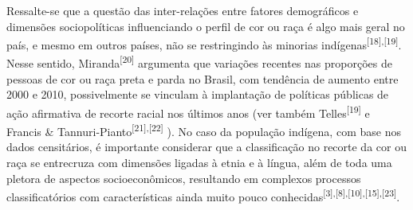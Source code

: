 \documentclass{article}
\begin{document}
Ressalte-se que a questão das inter-relações entre fatores demográficos e
dimensões sociopolíticas influenciando o perfil de cor ou raça é algo mais geral
no país, e mesmo em outros países, não se restringindo às minorias indígenas\textsuperscript{[}\textsuperscript{18}\textsuperscript{]}\textsuperscript{,}\textsuperscript{[}\textsuperscript{19}\textsuperscript{]}. Nesse sentido, Miranda\textsuperscript{[}\textsuperscript{20}\textsuperscript{]}
argumenta que variações recentes nas proporções de pessoas de cor ou raça preta
e parda no Brasil, com tendência de aumento entre 2000 e 2010, possivelmente se
vinculam à implantação de políticas públicas de ação afirmativa de recorte
racial nos últimos anos (ver também Telles\textsuperscript{[}\textsuperscript{19}\textsuperscript{]}
e Francis \& Tannuri-Pianto\textsuperscript{[}\textsuperscript{21}\textsuperscript{]}\textsuperscript{,}\textsuperscript{[}\textsuperscript{22}\textsuperscript{]}
). No caso da população indígena, com base nos dados censitários, é importante
considerar que a classificação no recorte da cor ou raça se entrecruza com
dimensões ligadas à etnia e à língua, além de toda uma pletora de aspectos
socioeconômicos, resultando em complexos processos classificatórios com
características ainda muito pouco conhecidas\textsuperscript{[}\textsuperscript{3}\textsuperscript{]}\textsuperscript{,}\textsuperscript{[}\textsuperscript{8}\textsuperscript{]}\textsuperscript{,}\textsuperscript{[}\textsuperscript{10}\textsuperscript{]}\textsuperscript{,}\textsuperscript{[}\textsuperscript{15}\textsuperscript{]}\textsuperscript{,}\textsuperscript{[}\textsuperscript{23}\textsuperscript{]}.
\end{document}

